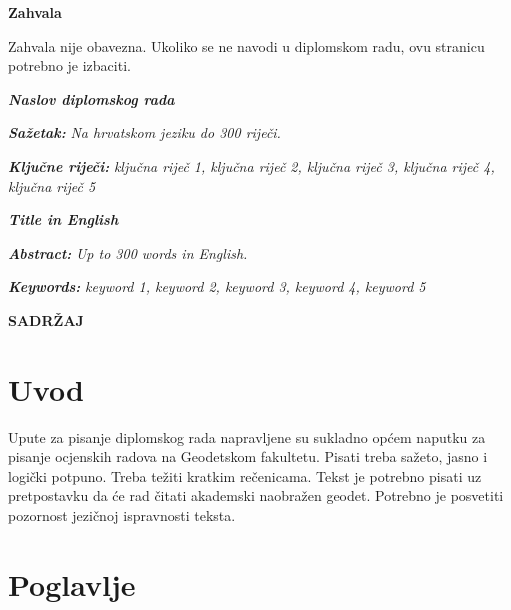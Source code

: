 \documentclass[12pt, oneside, a4paper, hidelinks]{report}
\newcommand{\mytitle}{Naslov diplomskog rada}
\newcommand{\myauthor}{Ime i prezime}
\newcommand{\myabstract}{Na hrvatskom jeziku do 300 riječi.}
\newcommand{\mykeywords}{ključna riječ 1, ključna riječ 2, ključna riječ 3, ključna riječ 4, ključna riječ 5}
\begin{document}
	\newpage
	\vspace*{4.5in}
	\noindent
	\large\textbf{Zahvala}
	\begin{spacing}{1.5}
		\noindent\normalsize
		Zahvala nije obavezna. Ukoliko se ne navodi u diplomskom radu, ovu stranicu potrebno je izbaciti.
	\end{spacing}
	
	\newpage
	\normalsize
	\begin{center}
		\textbf{\textit{\mytitle}}
	\end{center}
	\textbf{\textit{Sažetak: }}\textit{\myabstract}
	
	\textbf{\textit{Ključne riječi: }}\textit{\mykeywords}
	
	\vfill
	
	\begin{center}
		\textbf{\textit{Title in English}}
	\end{center}
	\textbf{\textit{Abstract: }}\textit{Up to 300 words in English.}
	
	\textbf{\textit{Keywords: }}\textit{keyword 1, keyword 2, keyword 3, keyword 4, keyword 5}
	
	\newpage
	\setlength{\cftbeforetoctitleskip}{0pt}
	\setlength{\cftaftertoctitleskip}{0pt}
	\renewcommand{\contentsname}{}
	\begin{center}
		\textbf{\large\MakeUppercase{Sadržaj}}
	\end{center} 
	\tableofcontents
	
	\chapter{Uvod}
	\normalsize
	\thispagestyle{fancy}
	
	\pagestyle{fancy}
	\fancyhf{}
	\fancyhead[L]{\small \myauthor}
	
	\renewcommand{\headrulewidth}{0.4pt}
	\renewcommand{\footrulewidth}{0.4pt}
	\setlength{\headheight}{13.6pt}
	\fancyfoot[R]{\small \thepage}
	
	Upute za pisanje diplomskog rada napravljene su sukladno općem naputku za pisanje ocjenskih radova na Geodetskom fakultetu. Pisati treba sažeto, jasno i logički potpuno. Treba težiti kratkim rečenicama. Tekst je potrebno pisati uz pretpostavku da će rad čitati akademski naobražen geodet. Potrebno je posvetiti pozornost jezičnoj ispravnosti teksta.	
	
	\chapter{Poglavlje}
	\thispagestyle{fancy}
	
\end{document}
